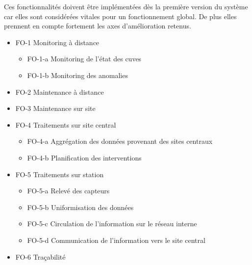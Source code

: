 \documentclass[a4paper,12pt]{article}
\begin{document}
Ces fonctionnalités doivent être implémentées dès la première version du système car elles sont considérées vitales pour un fonctionnement global. De plus elles prennent en compte fortement les axes d'amélioration retenus.
%
\begin{itemize}

\item FO-1 Monitoring à distance
%
\begin{itemize}

\item FO-1-a Monitoring de l'état des cuves

\item FO-1-b Monitoring des anomalies

\end{itemize}

\item FO-2 Maintenance à distance

\item FO-3 Maintenance sur site

\item FO-4 Traitements sur site central
%
\begin{itemize}

\item FO-4-a Aggrégation des données provenant des sites centraux

\item FO-4-b Planification des interventions

\end{itemize}

\item FO-5 Traitements sur station
%
\begin{itemize}

\item FO-5-a Relevé des capteurs

\item FO-5-b Uniformisation des données

\item FO-5-c Circulation de l'information sur le réseau interne

\item FO-5-d Communication de l'information vers le site central

\end{itemize}

\item FO-6 Traçabilité

\end{itemize}
\end{document}
